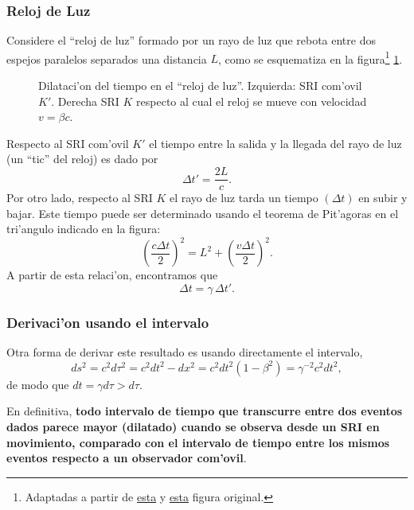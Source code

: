 \subsubsection{Reloj de Luz}
Considere el ``reloj de luz'' formado por un rayo de luz que rebota entre dos espejos paralelos separados una distancia $L$, como se esquematiza en la figura\footnote{Adaptadas a partir de \href{http://en.wikipedia.org/wiki/File:Time-dilation-001.svg}{esta} y \href{http://en.wikipedia.org/wiki/File:Time-dilation-002.svg}{esta} figura original.} \ref{dt}.
\begin{figure}[!h]
\centerline{\hspace{1cm}}
 \caption{Dilataci'on del tiempo en el ``reloj de luz''. Izquierda: SRI com'ovil $K'$. Derecha SRI $K$ respecto al cual el reloj se mueve con velocidad $v=\beta c$.}
\label{dt}
\end{figure}
Respecto al SRI com'ovil $K'$ el tiempo entre la salida y la llegada del rayo de luz (un ``tic'' del reloj) es dado por
\begin{equation}
\Delta t'=\frac{2L}{c}.
\end{equation}
Por otro lado, respecto al SRI $K$ el rayo de luz tarda un tiempo $(\Delta t)$ en subir y bajar. Este tiempo puede ser determinado usando el teorema de Pit'agoras en el tri'angulo indicado en la figura:	
\begin{equation}
\left(\frac{c\Delta t}{2}\right)^2=L^2+\left(\frac{v\Delta t}{2}\right)^2.
\end{equation}
A partir de esta relaci'on, encontramos que
\begin{equation}
\Delta t=\gamma\,\Delta t'.
\end{equation}

\subsubsection{Derivaci'on usando el intervalo}

Otra forma de derivar este resultado es usando directamente el intervalo,
\begin{equation}
 ds^2=c^2d\tau^2=c^2dt^2-dx^2=c^2dt^2(1-\beta^2)=\gamma^{-2}c^2dt^2,
\end{equation}
de modo que $dt=\gamma d\tau>d\tau$.


En definitiva, \textbf{todo intervalo de tiempo que transcurre entre dos eventos dados parece mayor (dilatado) cuando se observa desde un SRI en movimiento, comparado con el intervalo de tiempo entre los mismos eventos respecto a un observador com'ovil}.

